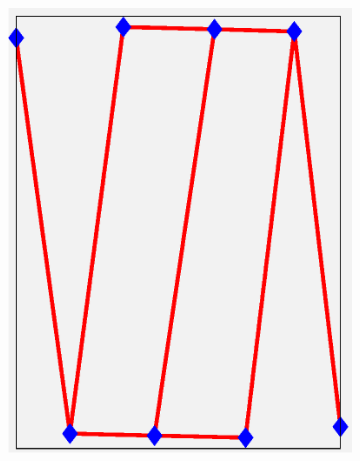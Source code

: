 \documentclass[11pt,letterpaper]{article}
\begin{document}
\begin{figure}[!h]
\centering
\begin{subfigure}{0.2\textwidth}
\includegraphics[width=\linewidth]{parallelTwoPareto_sim0_minT8.eps}
\caption{}
\end{subfigure}
\begin{subfigure}{0.2\textwidth}

\end{subfigure}
\end{figure}
\end{document}
